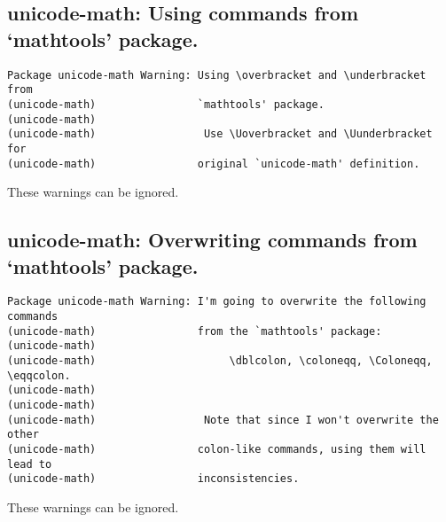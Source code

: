 \subsection{unicode-math: Using commands from `mathtools' package.}

\begin{verbatim}
Package unicode-math Warning: Using \overbracket and \underbracket from
(unicode-math)                `mathtools' package.
(unicode-math)                 
(unicode-math)                 Use \Uoverbracket and \Uunderbracket for
(unicode-math)                original `unicode-math' definition.
\end{verbatim}
These warnings can be ignored.

\subsection{unicode-math: Overwriting commands from `mathtools' package.}

\begin{verbatim}
Package unicode-math Warning: I'm going to overwrite the following commands
(unicode-math)                from the `mathtools' package: 
(unicode-math)                 
(unicode-math)                     \dblcolon, \coloneqq, \Coloneqq, \eqqcolon.
(unicode-math)                
(unicode-math)                 
(unicode-math)                 Note that since I won't overwrite the other
(unicode-math)                colon-like commands, using them will lead to
(unicode-math)                inconsistencies.
\end{verbatim}
These warnings can be ignored.


